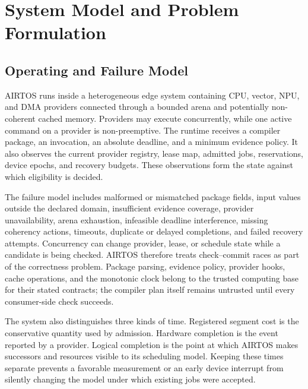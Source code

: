 \documentclass[lettersize,journal]{IEEEtran}
\begin{document}
\section{System Model and Problem Formulation}
\subsection{Operating and Failure Model}
AIRTOS runs inside a heterogeneous edge system containing CPU, vector, NPU,
and DMA providers connected through a bounded arena and potentially
non-coherent cached memory. Providers may execute concurrently, while one
active command on a provider is non-preemptive. The runtime receives a
compiler package, an invocation, an absolute deadline, and a minimum evidence
policy. It also observes the current provider registry, lease map, admitted
jobs, reservations, device epochs, and recovery budgets. These observations
form the state against which eligibility is decided.

The failure model includes malformed or mismatched package fields, input
values outside the declared domain, insufficient evidence coverage, provider
unavailability, arena exhaustion, infeasible deadline interference, missing
coherency actions, timeouts, duplicate or delayed completions, and failed
recovery attempts. Concurrency can change provider, lease, or schedule state
while a candidate is being checked. AIRTOS therefore treats check--commit
races as part of the correctness problem. Package parsing, evidence policy,
provider hooks, cache operations, and the monotonic clock belong to the trusted
computing base for their stated contracts; the compiler plan itself remains
untrusted until every consumer-side check succeeds.

The system also distinguishes three kinds of time. Registered segment cost is
the conservative quantity used by admission. Hardware completion is the event
reported by a provider. Logical completion is the point at which AIRTOS makes
successors and resources visible to its scheduling model. Keeping these times
separate prevents a favorable measurement or an early device interrupt from
silently changing the model under which existing jobs were accepted.
\end{document}
